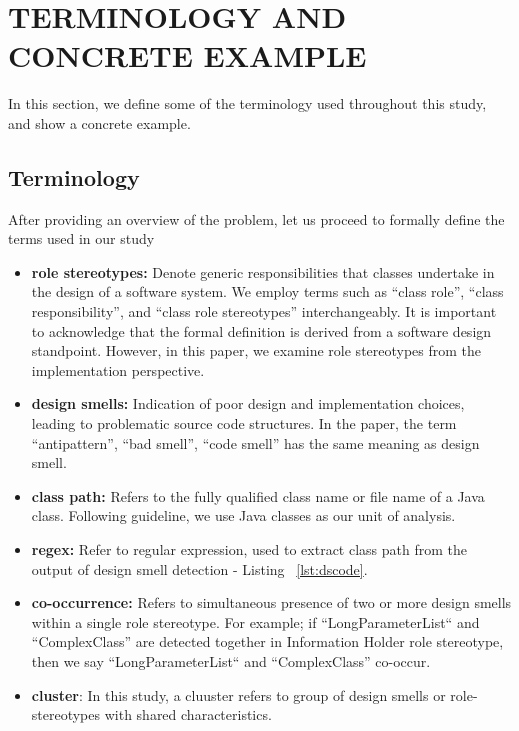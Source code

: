 \documentclass[AMA,Times1COL]{WileyNJDv5} %
\begin{document}
\section{TERMINOLOGY AND CONCRETE EXAMPLE}\label{sec:terminologies}
In this section, we define some of the terminology used throughout this study, and show a concrete example.
\subsection{Terminology}
After providing an overview of the problem, let us proceed to formally define the terms used in our study
\begin{itemize}
	\item \textbf{role stereotypes:} Denote generic responsibilities that classes undertake in the design of a software system. We employ terms such as ``class role'', ``class responsibility'', and ``class role stereotypes'' interchangeably. It is important to acknowledge that the formal definition is derived from a software design standpoint. However, in this paper, we examine role stereotypes from the implementation perspective.
	
	\item \textbf{design smells:} Indication of poor design and implementation choices, leading to problematic source code structures. In the paper, the term ``antipattern'', ``bad smell'', ``code smell'' has the same meaning as design smell.
	\item \textbf{class path:} Refers to the fully qualified class name or file name of a Java class. Following \cite{runeson2012case} guideline, we use Java classes as our unit of analysis.
	\item \textbf{regex:}  Refer to regular expression, used to extract class path from the output of design smell detection - Listing ~\ref{lst:dscode}.
	\item \textbf{co-occurrence:} Refers to simultaneous presence of two or more design smells within a single role stereotype. For example; if ``LongParameterList`` and ``ComplexClass'' are detected together in Information Holder role stereotype, then we say  ``LongParameterList`` and ``ComplexClass'' co-occur.
	\item \textbf{cluster}: In this study, a cluuster refers to group of design smells or role-stereotypes with shared characteristics.
\end{itemize}
\end{document}
